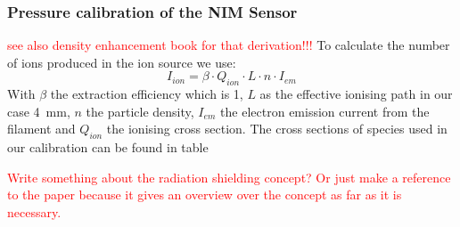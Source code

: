 		

		\subsubsection{Pressure calibration of the NIM Sensor}
		
		
		
		\textcolor{red}{see also density enhancement book for that derivation!!!}
		To calculate the number of ions produced in the ion source we use:
		\begin{equation}
		I_{ion} = \beta\cdot Q_{ion}\cdot L\cdot n\cdot I_{em}
		\end{equation}
		With $\beta$ the extraction efficiency which is 1, %
		$L$ as the effective ionising path in our case 4~\si{\milli\metre}, $n$ the particle density, $I_{em}$ the electron emission current from the filament and $Q_{ion}$ the ionising cross section. The cross sections of species used in our calibration can be found in table %
		
		\textcolor{red}{Write something about the radiation shielding concept? Or just make a reference to the paper because it gives an overview over the concept as far as it is necessary.}
		

